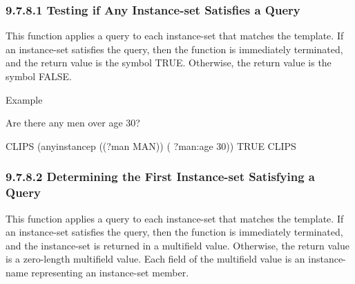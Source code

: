 \documentclass[letterpaper,10pt,english]{sphinxmanual}
\begin{document}
\subsubsection{9.7.8.1 Testing if Any Instance-set Satisfies a Query}
\label{\detokenize{cool:testing-if-any-instance-set-satisfies-a-query}}
This function applies a query to each instance-set that matches the
template. If an instance-set satisfies the query, then the function is
immediately terminated, and the return value is the symbol TRUE.
Otherwise, the return value is the symbol FALSE.


\begin{sphinxVerbatim}[commandchars=\\\{\}]
  
\end{sphinxVerbatim}

Example

Are there any men over age 30?

\begin{sphinxVerbatim}[commandchars=\\\{\}]
CLIPS\PYGZgt{} (any\PYGZhy{}instancep ((?man MAN)) (\PYGZgt{} ?man:age 30))
TRUE
CLIPS\PYGZgt{}
\end{sphinxVerbatim}


\subsubsection{9.7.8.2 Determining the First Instance-set Satisfying a Query}
\label{\detokenize{cool:determining-the-first-instance-set-satisfying-a-query}}
This function applies a query to each instance-set that matches the
template. If an instance-set satisfies the query, then the function is
immediately terminated, and the instance-set is returned in a multifield
value. Otherwise, the return value is a zero-length multifield value.
Each field of the multifield value is an instance-name representing an
instance-set member.


\begin{sphinxVerbatim}[commandchars=\\\{\}]
  
\end{sphinxVerbatim}
\end{document}
